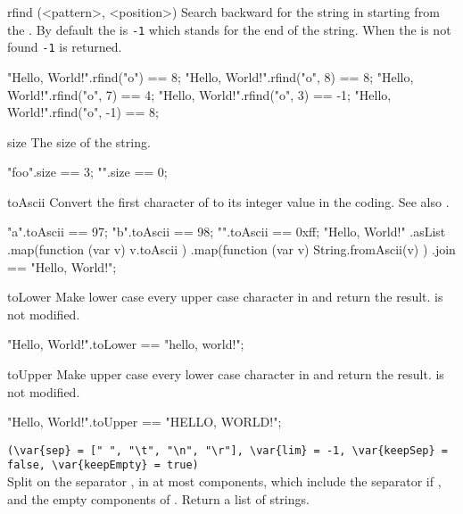 \begin{urbiscriptapi}
\item[rfind](<pattern>, <position>)%
  Search backward for the  string in \this starting from the
  .  By default the  is \lstinline|-1| which
  stands for the end of the string.  When the  is not found
  \lstinline|-1| is returned.
\begin{urbiassert}
"Hello, World!".rfind("o") == 8;
"Hello, World!".rfind("o", 8) == 8;
"Hello, World!".rfind("o", 7) == 4;
"Hello, World!".rfind("o", 3) == -1;
"Hello, World!".rfind("o", -1) == 8;
\end{urbiassert}


\item[size]
  The size of the string.
\begin{urbiassert}
"foo".size == 3;
   "".size == 0;
\end{urbiassert}





\item[toAscii] Convert the first character of \this to its integer value in
  the  coding.  See also .
\begin{urbiassert}
   "a".toAscii == 97;
   "b".toAscii == 98;
"\xff".toAscii == 0xff;
"Hello, World!\n"
  .asList
  .map(function (var v) { v.toAscii })
  .map(function (var v) { String.fromAscii(v) })
  .join
  == "Hello, World!\n";
\end{urbiassert}


\item[toLower]
  Make lower case every upper case character in \this and
  return the result.  \this is not modified.
\begin{urbiassert}
"Hello, World!".toLower == "hello, world!";
\end{urbiassert}


\item[toUpper]
  Make upper case every lower case character in \this and
  return the result.  \this is not modified.
\begin{urbiassert}
"Hello, World!".toUpper == "HELLO, WORLD!";
\end{urbiassert}


\item {}%
  \lstinline|(\var{sep} = [" ", "\t", "\n", "\r"], \var{lim} = -1, \var{keepSep} = false, \var{keepEmpty} = true)|\\
  Split \this on the separator , in at most 
  components, which include the separator if , and the
  empty components of .  Return a list of strings.


\end{urbiscriptapi}
